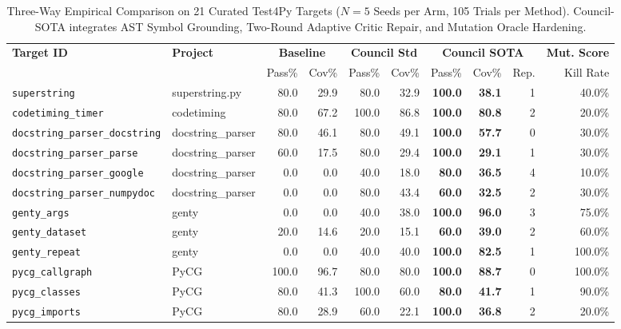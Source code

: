 \documentclass[conference]{IEEEtran}
\begin{document}
\begin{table}[t]
\centering
\small
\caption{Three-Way Empirical Comparison on 21 Curated Test4Py Targets ($N=5$ Seeds per Arm, 105 Trials per Method). Council-SOTA integrates AST Symbol Grounding, Two-Round Adaptive Critic Repair, and Mutation Oracle Hardening.}
\label{tab:sota_results}
\begin{tabular}{ll|rr|rr|rrr|r}
\toprule
\textbf{Target ID} & \textbf{Project} & \multicolumn{2}{c|}{\textbf{Baseline}} & \multicolumn{2}{c|}{\textbf{Council Std}} & \multicolumn{3}{c|}{\textbf{Council SOTA}} & \textbf{Mut. Score} \\
 & & Pass\% & Cov\% & Pass\% & Cov\% & Pass\% & Cov\% & Rep. & Kill Rate \\
\midrule
\texttt{superstring} & superstring.py & 80.0 & 29.9 & 80.0 & 32.9 & \textbf{100.0} & \textbf{38.1} & 1 & 40.0\% \\
\texttt{codetiming\_timer} & codetiming & 80.0 & 67.2 & 100.0 & 86.8 & \textbf{100.0} & \textbf{80.8} & 2 & 20.0\% \\
\texttt{docstring\_parser\_docstring} & docstring\_parser & 80.0 & 46.1 & 80.0 & 49.1 & \textbf{100.0} & \textbf{57.7} & 0 & 30.0\% \\
\texttt{docstring\_parser\_parse} & docstring\_parser & 60.0 & 17.5 & 80.0 & 29.4 & \textbf{100.0} & \textbf{29.1} & 1 & 30.0\% \\
\texttt{docstring\_parser\_google} & docstring\_parser & 0.0 & 0.0 & 40.0 & 18.0 & \textbf{80.0} & \textbf{36.5} & 4 & 10.0\% \\
\texttt{docstring\_parser\_numpydoc} & docstring\_parser & 0.0 & 0.0 & 80.0 & 43.4 & \textbf{60.0} & \textbf{32.5} & 2 & 30.0\% \\
\texttt{genty\_args} & genty & 0.0 & 0.0 & 40.0 & 38.0 & \textbf{100.0} & \textbf{96.0} & 3 & 75.0\% \\
\texttt{genty\_dataset} & genty & 20.0 & 14.6 & 20.0 & 15.1 & \textbf{60.0} & \textbf{39.0} & 2 & 60.0\% \\
\texttt{genty\_repeat} & genty & 0.0 & 0.0 & 40.0 & 40.0 & \textbf{100.0} & \textbf{82.5} & 1 & 100.0\% \\
\texttt{pycg\_callgraph} & PyCG & 100.0 & 96.7 & 80.0 & 80.0 & \textbf{100.0} & \textbf{88.7} & 0 & 100.0\% \\
\texttt{pycg\_classes} & PyCG & 80.0 & 41.3 & 100.0 & 60.0 & \textbf{80.0} & \textbf{41.7} & 1 & 90.0\% \\
\texttt{pycg\_imports} & PyCG & 80.0 & 28.9 & 60.0 & 22.1 & \textbf{100.0} & \textbf{36.8} & 2 & 20.0\% \\

\end{tabular}
\end{table}
\end{document}
